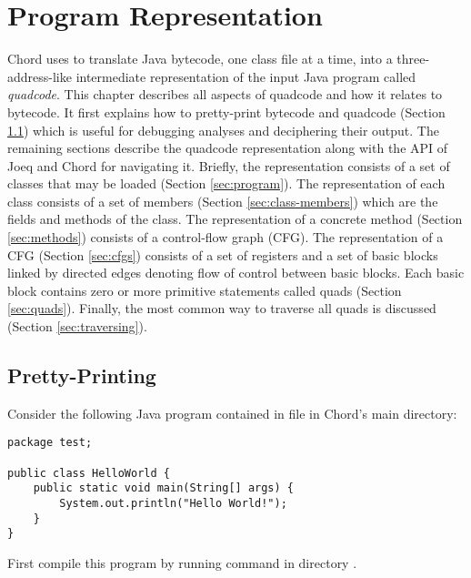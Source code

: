 \chapter{Program Representation}
\label{chap:program-representation}

Chord uses  to translate
Java bytecode, one class file at a time, into a three-address-like
intermediate representation of the input Java program called {\it
quadcode}.  This chapter describes all aspects of quadcode and how it
relates to bytecode.  It first explains how to pretty-print bytecode
and quadcode (Section \ref{sec:pretty-printing}) which is useful for
debugging analyses and deciphering their output.  The remaining
sections describe the quadcode representation along with the API of
Joeq and Chord for navigating it.  Briefly, the representation
consists of a set of classes that may be loaded
(Section \ref{sec:program}).  The representation of each class consists
of a set of members (Section \ref{sec:class-members}) which are the fields and methods
of the class.  The representation of a concrete
method (Section \ref{sec:methods}) consists of a control-flow graph
(CFG).  The representation of a CFG (Section \ref{sec:cfgs}) consists
of a set of registers and a set of basic blocks linked by directed edges
denoting flow of control between basic blocks.
Each basic block contains zero or more primitive statements called quads
(Section \ref{sec:quads}).  Finally, the most common way to traverse
all quads is discussed (Section \ref{sec:traversing}).

\section{Pretty-Printing}
\label{sec:pretty-printing}

Consider the following Java program contained in
file  in Chord's
main directory:
\begin{framed}
\begin{verbatim}
package test;

public class HelloWorld {
    public static void main(String[] args) {
        System.out.println("Hello World!");
    }
}
\end{verbatim}
\end{framed}

First compile this program by running command  in
directory .

